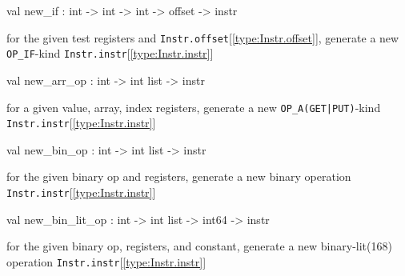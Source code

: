 \documentclass[11pt]{article}
\begin{document}
\label{val:Instr.new-underscoreif}\begin{ocamldoccode}
val new_if : int -> int -> int -> offset -> instr
\end{ocamldoccode}
\begin{ocamldocdescription}
for the given test registers and {\tt{Instr.offset}}[\ref{type:Instr.offset}],
 generate a new {\tt{OP\_IF}}-kind {\tt{Instr.instr}}[\ref{type:Instr.instr}]


\end{ocamldocdescription}




\label{val:Instr.new-underscorearr-underscoreop}\begin{ocamldoccode}
val new_arr_op : int -> int list -> instr
\end{ocamldoccode}
\begin{ocamldocdescription}
for a given value, array, index registers,
 generate a new {\tt{OP\_A(GET|PUT)}}-kind {\tt{Instr.instr}}[\ref{type:Instr.instr}]


\end{ocamldocdescription}




\label{val:Instr.new-underscorebin-underscoreop}\begin{ocamldoccode}
val new_bin_op : int -> int list -> instr
\end{ocamldoccode}
\begin{ocamldocdescription}
for the given binary op and registers,
 generate a new binary operation {\tt{Instr.instr}}[\ref{type:Instr.instr}]


\end{ocamldocdescription}




\label{val:Instr.new-underscorebin-underscorelit-underscoreop}\begin{ocamldoccode}
val new_bin_lit_op : int -> int list -> int64 -> instr
\end{ocamldoccode}
\begin{ocamldocdescription}
for the given binary op, registers, and constant,
 generate a new binary-lit(16{\textbar}8) operation {\tt{Instr.instr}}[\ref{type:Instr.instr}]


\end{ocamldocdescription}
\end{document}
